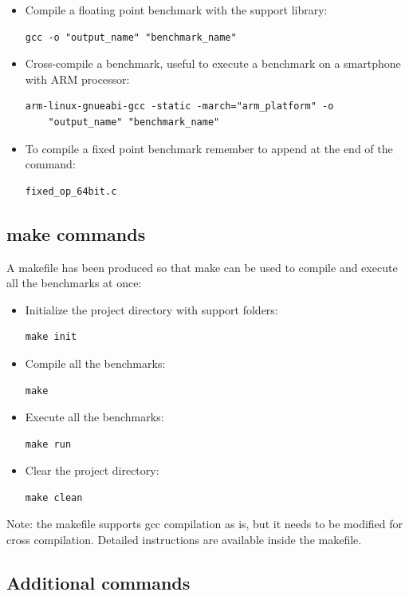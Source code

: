 \begin{itemize}
	\item Compile a floating point benchmark with the support library: \begin{verbatim}gcc -o "output_name" "benchmark_name"\end{verbatim}
	\item Cross-compile a benchmark, useful to execute a benchmark on a smartphone with ARM processor: \begin{verbatim}arm-linux-gnueabi-gcc -static -march="arm_platform" -o 
	"output_name" "benchmark_name"\end{verbatim}
	\item To compile a fixed point benchmark remember to append at the end of the command: \begin{verbatim}fixed_op_64bit.c\end{verbatim}
\end{itemize}


\subsection{make commands}

A makefile has been produced so that make can be used to compile and execute all the benchmarks at once:

\begin{itemize}
	\item Initialize the project directory with support folders:\begin{verbatim}make init\end{verbatim}
	\item Compile all the benchmarks: \begin{verbatim}make\end{verbatim}
	\item Execute all the benchmarks: \begin{verbatim}make run\end{verbatim}
	\item Clear the project directory: \begin{verbatim}make clean\end{verbatim}
\end{itemize}

Note: the makefile supports gcc compilation as is, but it needs to be modified for cross compilation. Detailed instructions are available inside the makefile.

\subsection{Additional commands}

